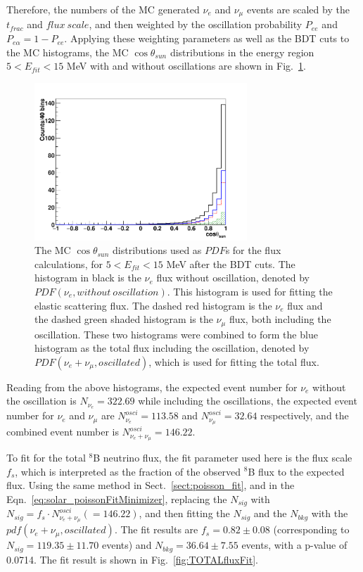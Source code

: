 Therefore, the numbers of the MC generated $\nu_e$ and $\nu_\mu$ events are scaled by the $t_{frac}$ and $flux~scale$, and then weighted by the oscillation probability $P_{ee}$ and $P_{e\alpha}=1-P_{ee}$. Applying these weighting parameters as well as the BDT cuts to the MC histograms, the MC $\cos\theta_{sun}$ distributions in the energy region $5<E_{fit}<15$ MeV with and without oscillations are shown in Fig.~\ref{fig:MCfluxPdfs}.

\begin{figure}[!htb]
	\centering
	\includegraphics[width=8cm]{MCfluxPdfs.png}
	\caption[The MC $\cos\theta_{sun}$ distributions used as $PDF$s for the flux calculations, for $5<E_{fit}<15$ MeV after the BDT cuts.]{The MC $\cos\theta_{sun}$ distributions used as $PDF$s for the flux calculations, for $5<E_{fit}<15$ MeV after the BDT cuts. The histogram in black is the $\nu_e$ flux without oscillation, denoted by $PDF(\nu_e,without~oscillation)$. This histogram is used for fitting the elastic scattering flux. The dashed red histogram is the $\nu_e$ flux and the dashed green shaded histogram is the $\nu_\mu$ flux, both including the oscillation. These two histograms were combined to form the blue histogram as the total flux including the oscillation, denoted by $PDF(\nu_e+\nu_\mu,oscillated)$, which is used for fitting the total flux.}
	\label{fig:MCfluxPdfs}
\end{figure} 

Reading from the above histograms, the expected event number for $\nu_e$ without the oscillation is $N_{\nu_e} = 322.69$ while including the oscillations, the expected event number for $\nu_e$ and $\nu_\mu$ are $N^{osci}_{\nu_e} = 113.58$ and $N^{osci}_{\nu_\mu} = 32.64$ respectively, and the combined event number is $N^{osci}_{\nu_e+\nu_\mu}=146.22$.

To fit for the total $^8$B neutrino flux, the fit parameter used here is the flux scale $f_s$, which is interpreted as the fraction of the observed $^8$B flux to the expected flux. Using the same method in Sect.~\ref{sect:poisson_fit}, and in the Eqn.~\ref{eq:solar_poissonFitMinimizer}, replacing the $N_{sig}$ with $N_{sig}=f_s\cdot N^{osci}_{\nu_e+\nu_\mu}(=146.22)$, and then fitting the $N_{sig}$ and the $N_{bkg}$ with the $pdf(\nu_e+\nu_\mu,oscillated)$. The fit results are $f_s=0.82\pm 0.08$ (corresponding to $N_{sig}=119.35\pm11.70$  events) and $N_{bkg}=36.64\pm7.55$ events, with a p-value of 0.0714. The fit result is shown in Fig.~\ref{fig:TOTALfluxFit}.


